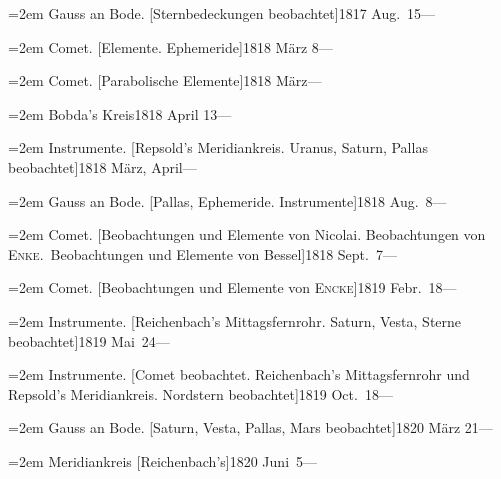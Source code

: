 \documentclass[12pt,a4paper]{article}
\begin{document}
{{{{{{{{\vspace{0.5mm}
\noindent\hangindent=2em
Gauss an Bode. [Sternbedeckungen beobachtet]\hfill 1817 Aug.\ 15\quad ---

\vspace{0.5mm}
\noindent\hangindent=2em
Comet. [Elemente. Ephemeride]\hfill 1818 M\"arz 8\quad ---

\vspace{0.5mm}
\noindent\hangindent=2em
Comet. [Parabolische Elemente]\hfill 1818 M\"arz\quad ---

\vspace{0.5mm}
\noindent\hangindent=2em
Bobda's Kreis\hfill 1818 April 13\quad ---

\vspace{0.5mm}
\noindent\hangindent=2em
Instrumente. [Repsold's Meridiankreis. Uranus, Saturn, Pallas beobachtet]\hfill 1818 M\"arz, April\quad ---

\vspace{0.5mm}
\noindent\hangindent=2em
Gauss an Bode. [Pallas, Ephemeride. Instrumente]\hfill 1818 Aug.\ 8\quad ---

\vspace{0.5mm}
\noindent\hangindent=2em
Comet. [Beobachtungen und Elemente von Nicolai. Beobachtungen von \textsc{Enke}.\ Beobachtungen und Elemente von Bessel]\hfill 1818 Sept.\ 7\quad ---

\vspace{0.5mm}
\noindent\hangindent=2em
Comet. [Beobachtungen und Elemente von \textsc{Encke}]\hfill 1819 Febr.\ 18\quad ---

\vspace{0.5mm}
\noindent\hangindent=2em
Instrumente. [Reichenbach's Mittagsfernrohr. Saturn, Vesta, Sterne beobachtet]\hfill 1819 Mai\ 24\quad ---

\vspace{0.5mm}
\noindent\hangindent=2em
Instrumente. [Comet beobachtet. Reichenbach's Mittagsfernrohr und Repsold's Meridiankreis. Nordstern beobachtet]\hfill 1819 Oct.\ 18\quad ---

\vspace{0.5mm}
\noindent\hangindent=2em
Gauss an Bode. [Saturn, Vesta, Pallas, Mars beobachtet]\hfill 1820 M\"arz 21\quad ---

\vspace{0.5mm}
\noindent\hangindent=2em
Meridiankreis [Reichenbach's]\hfill 1820 Juni\ 5\quad ---

}}}}}}}}
\end{document}
